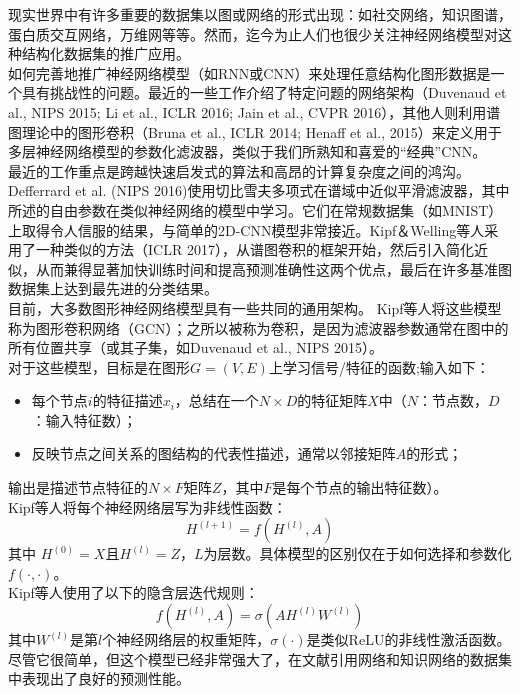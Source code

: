 \documentclass[a4paper,UTF8]{article}
\begin{document}
现实世界中有许多重要的数据集以图或网络的形式出现：如社交网络，知识图谱，蛋白质交互网络，万维网等等。然而，迄今为止人们也很少关注神经网络模型对这种结构化数据集的推广应用。\\

如何完善地推广神经网络模型（如RNN或CNN）来处理任意结构化图形数据是一个具有挑战性的问题。最近的一些工作介绍了特定问题的网络架构（Duvenaud et al., NIPS 2015; Li et al., ICLR 2016; Jain et al., CVPR 2016），其他人则利用谱图理论中的图形卷积（Bruna et al., ICLR 2014; Henaff et al., 2015）来定义用于多层神经网络模型的参数化滤波器，类似于我们所熟知和喜爱的“经典”CNN。\\

最近的工作重点是跨越快速启发式的算法和高昂的计算复杂度之间的鸿沟。Defferrard et al. (NIPS 2016)使用切比雪夫多项式在谱域中近似平滑滤波器，其中所述的自由参数在类似神经网络的模型中学习。它们在常规数据集（如MNIST）上取得令人信服的结果，与简单的2D-CNN模型非常接近。Kipf＆Welling等人采用了一种类似的方法（ICLR 2017），从谱图卷积的框架开始，然后引入简化近似，从而兼得显著加快训练时间和提高预测准确性这两个优点，最后在许多基准图数据集上达到最先进的分类结果。\\

目前，大多数图形神经网络模型具有一些共同的通用架构。 Kipf等人将这些模型称为图形卷积网络（GCN）；之所以被称为卷积，是因为滤波器参数通常在图中的所有位置共享（或其子集，如Duvenaud et al., NIPS 2015）。\\

对于这些模型，目标是在图形$G=(V,E)$上学习信号/特征的函数;输入如下：
\begin{itemize}
	\item 每个节点$i$的特征描述$x_i$，总结在一个$N×D$的特征矩阵$X$中（$N$：节点数，$D$：输入特征数）；
	\item 反映节点之间关系的图结构的代表性描述，通常以邻接矩阵$A$的形式；
\end{itemize}

输出是描述节点特征的$N×F$矩阵$Z$，其中$F$是每个节点的输出特征数）。\\

Kipf等人将每个神经网络层写为非线性函数：\\
$$H^{(l+1)}= f(H^{(l)},A)$$
其中 $H^{(0)}= X$且$H^{(l)}= Z$，$L$为层数。具体模型的区别仅在于如何选择和参数化$f(\cdot,\cdot)$。\\

Kipf等人使用了以下的隐含层迭代规则：\\
$$f(H^{(l)},A) = \sigma(AH^{(l)}W^{(l)})$$
其中$W^{(l)}$是第$l$个神经网络层的权重矩阵，$\sigma(\cdot)$是类似ReLU的非线性激活函数。尽管它很简单，但这个模型已经非常强大了，在文献引用网络和知识网络的数据集中表现出了良好的预测性能。\\
\end{document}
